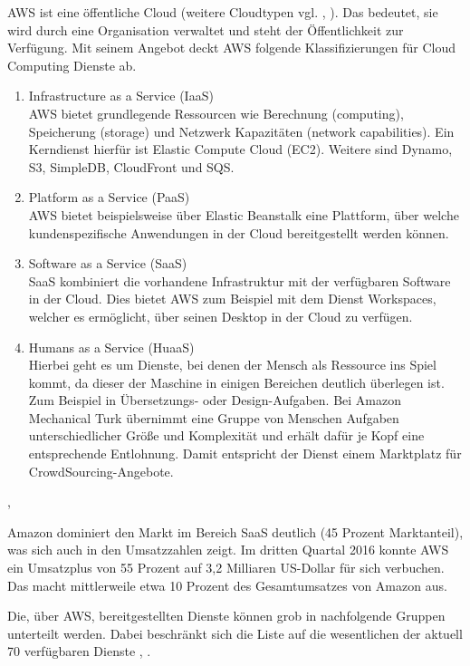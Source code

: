 {AWS ist eine öffentliche Cloud (weitere Cloudtypen vgl. \cite{wittig:awsinaction}, \cite{baun:cloudcomp}). Das bedeutet, sie wird durch eine Organisation verwaltet und steht der Öffentlichkeit zur Verfügung. Mit seinem Angebot deckt AWS folgende Klassifizierungen für Cloud Computing Dienste ab.
\begin{enumerate}
  \item Infrastructure as a Service (IaaS)
  \\AWS bietet grundlegende Ressourcen wie Berechnung (computing), Speicherung (storage) und Netzwerk Kapazitäten (network capabilities). Ein Kerndienst hierfür ist Elastic Compute Cloud (EC2). Weitere sind Dynamo, S3, SimpleDB, CloudFront und SQS.
  \item Platform as a Service (PaaS)
  \\AWS bietet beispielsweise über Elastic Beanstalk eine Plattform, über welche kundenspezifische Anwendungen in der Cloud bereitgestellt werden können.
  \item Software as a Service (SaaS)
  \\SaaS kombiniert die vorhandene Infrastruktur mit der verfügbaren Software in der Cloud. Dies bietet AWS zum Beispiel mit dem Dienst Workspaces, welcher es ermöglicht, über seinen Desktop in der Cloud zu verfügen.
  \item Humans as a Service (HuaaS)
  \\ Hierbei geht es um Dienste, bei denen der Mensch als Ressource ins Spiel kommt, da dieser der Maschine in einigen Bereichen deutlich überlegen ist. Zum Beispiel in Übersetzungs- oder Design-Aufgaben. Bei Amazon Mechanical Turk übernimmt eine Gruppe von Menschen Aufgaben unterschiedlicher Größe und Komplexität und erhält dafür je Kopf eine entsprechende Entlohnung. Damit entspricht der Dienst einem Marktplatz für CrowdSourcing-Angebote.
\end{enumerate} \cite{wittig:awsinaction}, \cite{baun:cloudcomp}

Amazon dominiert den Markt im Bereich SaaS deutlich (45 Prozent Marktanteil), was sich auch in den Umsatzzahlen zeigt. Im dritten Quartal 2016 konnte AWS ein Umsatzplus von 55 Prozent auf 3,2 Milliaren US-Dollar für sich verbuchen. Das macht mittlerweile etwa 10 Prozent des Gesamtumsatzes von Amazon aus. \cite{t3n:brien}

Die, über AWS, bereitgestellten Dienste können grob in nachfolgende Gruppen unterteilt werden. Dabei beschränkt sich die Liste auf die wesentlichen der aktuell 70 verfügbaren Dienste \cite{sendcheckit:plain}, \cite{aws:insider}.

}
